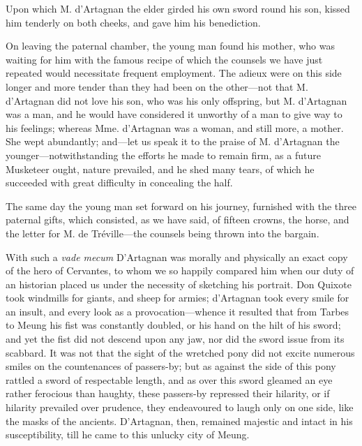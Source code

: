 Upon which M. d'Artagnan the elder girded his own sword round his son, kissed him tenderly on both cheeks, and gave him his benediction. 

On leaving the paternal chamber, the young man found his mother, who was waiting for him with the famous recipe of which the counsels we have just repeated would necessitate frequent employment. The adieux were on this side longer and more tender than they had been on the other---not that M. d'Artagnan did not love his son, who was his only offspring, but M. d'Artagnan was a man, and he would have considered it unworthy of a man to give way to his feelings; whereas Mme. d'Artagnan was a woman, and still more, a mother. She wept abundantly; and---let us speak it to the praise of M. d'Artagnan the younger---notwithstanding the efforts he made to remain firm, as a future Musketeer ought, nature prevailed, and he shed many tears, of which he succeeded with great difficulty in concealing the half. 

The same day the young man set forward on his journey, furnished with the three paternal gifts, which consisted, as we have said, of fifteen crowns, the horse, and the letter for M. de Tréville---the counsels being thrown into the bargain. 

With such a \textit{vade mecum} D'Artagnan was morally and physically an exact copy of the hero of Cervantes, to whom we so happily compared him when our duty of an historian placed us under the necessity of sketching his portrait. Don Quixote took windmills for giants, and sheep for armies; d'Artagnan took every smile for an insult, and every look as a provocation---whence it resulted that from Tarbes to Meung his fist was constantly doubled, or his hand on the hilt of his sword; and yet the fist did not descend upon any jaw, nor did the sword issue from its scabbard. It was not that the sight of the wretched pony did not excite numerous smiles on the countenances of passers-by; but as against the side of this pony rattled a sword of respectable length, and as over this sword gleamed an eye rather ferocious than haughty, these passers-by repressed their hilarity, or if hilarity prevailed over prudence, they endeavoured to laugh only on one side, like the masks of the ancients. D'Artagnan, then, remained majestic and intact in his susceptibility, till he came to this unlucky city of Meung. 


